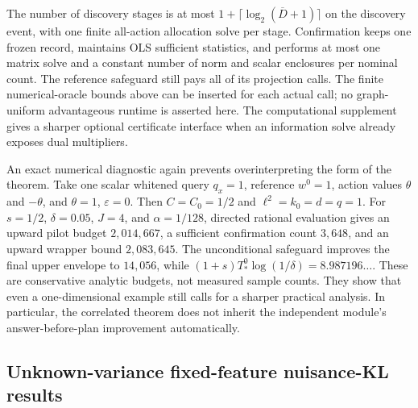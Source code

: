 \documentclass{article}
\theoremstyle{plain}
\theoremstyle{definition}
\begin{document}
The number of discovery stages is at most
$1+\lceil\log_2(\overline D+1)\rceil$ on the discovery event, with
one finite all-action allocation solve per stage.  Confirmation keeps
one frozen record, maintains OLS sufficient statistics, and performs at
most one matrix solve and a constant number of norm and scalar enclosures
per nominal count.  The reference safeguard still pays all of its
projection calls.  The finite numerical-oracle bounds above can be inserted for each
actual call; no graph-uniform advantageous runtime is asserted here.
The computational supplement gives a sharper optional certificate interface when an information solve already exposes dual multipliers.

An exact numerical diagnostic again prevents overinterpreting the form
of the theorem.  Take one scalar whitened query $q_x=1$, reference
$w^0=1$, action values $\theta$ and $-\theta$, and
$\theta=1$, $\varepsilon=0$.  Then $C=C_0=1/2$ and
$\ell^2=k_0=d=q=1$.  For $s=1/2$, $\delta=0.05$,
$J=4$, and $\alpha=1/128$, directed rational evaluation gives
an upward pilot budget $2{,}014{,}667$, a sufficient confirmation
count $3{,}648$, and an upward wrapper bound $2{,}083{,}645$.
The unconditional safeguard improves the final upper envelope to
$14{,}056$, while $(1+s)T_*^0\log(1/\delta)=8.987196\ldots$.
These are conservative analytic budgets, not measured sample counts.
They show that even a one-dimensional example still calls for a
sharper practical analysis.  In particular, the correlated theorem
does not inherit the independent module's answer-before-plan
improvement automatically.

\subsection{Unknown-variance fixed-feature nuisance-KL results}
\end{document}
